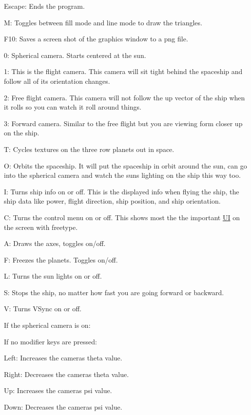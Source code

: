 \begin{DoxyItemize}
\item Escape\+: Ends the program.
\item M\+: Toggles between fill mode and line mode to draw the triangles.
\item F10\+: Saves a screen shot of the graphics window to a png file.
\item 0\+: Spherical camera. Starts centered at the sun.
\item 1\+: This is the flight camera. This camera will sit tight behind the spaceship and follow all of it\textquotesingle{}s orientation changes.
\item 2\+: Free flight camera. This camera will not follow the up vector of the ship when it rolls so you can watch it roll around things.
\item 3\+: Forward camera. Similar to the free flight but you are viewing form closer up on the ship.
\item T\+: Cycles textures on the three row planets out in space.
\item O\+: Orbits the spaceship. It will put the spaceship in orbit around the sun, can go into the spherical camera and watch the sun\textquotesingle{}s lighting on the ship this way too.
\item I\+: Turns ship info on or off. This is the displayed info when flying the ship, the ship data like power, flight direction, ship position, and ship orientation.
\item C\+: Turns the control menu on or off. This shows most the the important \hyperlink{class_u_i}{UI} on the screen with freetype.
\item A\+: Draws the axes, toggles on/off.
\item F\+: Freezes the planets. Toggles on/off.
\item L\+: Turns the sun lights on or off.
\item S\+: Stops the ship, no matter how fast you are going forward or backward.
\item V\+: Turns V\+Sync on or off.
\end{DoxyItemize}

If the spherical camera is on\+:

If no modifier keys are pressed\+:


\begin{DoxyItemize}
\item Left\+: Increases the camera\textquotesingle{}s theta value.
\item Right\+: Decreases the camera\textquotesingle{}s theta value.
\item Up\+: Increases the camera\textquotesingle{}s psi value.
\item Down\+: Decreases the camera\textquotesingle{}s psi value.
\end{DoxyItemize}

